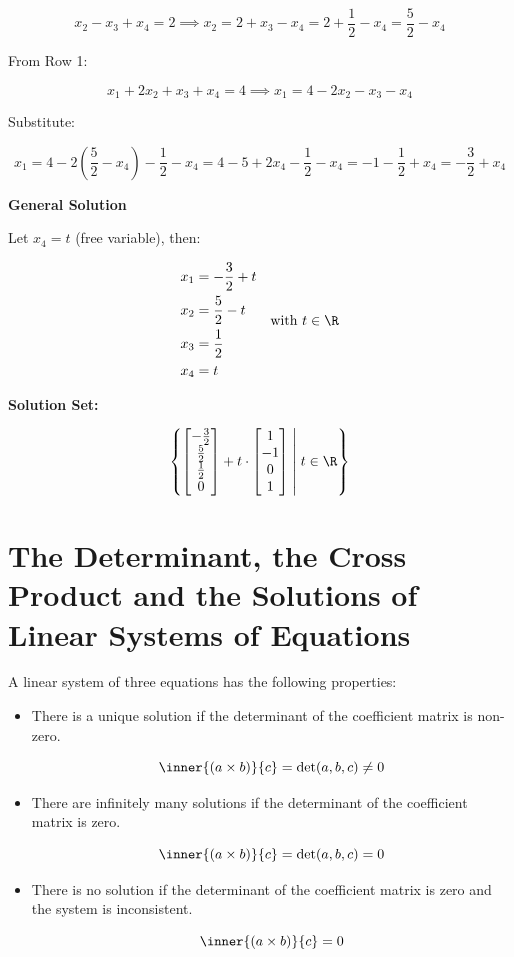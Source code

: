 \[
    x_2 - x_3 + x_4 = 2 \implies x_2 = 2 + x_3 - x_4 = 2 + \frac{1}{2} - x_4 = \frac{5}{2} - x_4
\]

From Row 1:

\[
    x_1 + 2x_2 + x_3 + x_4 = 4
    \implies x_1 = 4 - 2x_2 - x_3 - x_4
\]

Substitute:

\[
    x_1 = 4 - 2\left( \frac{5}{2} - x_4 \right) - \frac{1}{2} - x_4
    = 4 - 5 + 2x_4 - \frac{1}{2} - x_4
    = -1 - \frac{1}{2} + x_4 = -\frac{3}{2} + x_4
\]

\textbf{General Solution}

Let \(x_4 = t\) (free variable), then:

\[
    \begin{aligned}
        x_1 & = -\frac{3}{2} + t \\
        x_2 & = \frac{5}{2} - t  \\
        x_3 & = \frac{1}{2}      \\
        x_4 & = t
    \end{aligned}
    \quad \text{with } t \in \R
\]

\textbf{Solution Set:}

\[
    \left\{
    \begin{bmatrix}
        -\frac{3}{2} \\ \frac{5}{2} \\ \frac{1}{2} \\ 0
    \end{bmatrix}
    + t \cdot
    \begin{bmatrix}
        1 \\ -1 \\ 0 \\ 1
    \end{bmatrix}
    \;\middle|\; t \in \R
    \right\}
\]

\section{The Determinant, the Cross Product and the Solutions of Linear Systems of Equations}

A linear system of three equations has the following properties:

\begin{itemize}

    \item There is a unique solution if the determinant of the coefficient matrix is non-zero.

          \[
              \inner{(a \times b)}{c} = \det(a,b,c) \ne 0
          \]

    \item There are infinitely many solutions if the determinant of the coefficient matrix is zero.

          \[
              \inner{(a \times b)}{c} = \det(a,b,c) = 0
          \]

    \item There is no solution if the determinant of the coefficient matrix is zero and the system is inconsistent.

          \[
              \inner{(a \times b)}{c} = 0
          \]

\end{itemize}


